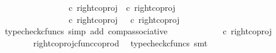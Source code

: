 \begin{isabellebody}
\ \ \isamarkupfalse%
{\isacharminus}{\kern0pt}\ \isanewline
\ \ \ \ \isamarkupfalse%
\ {\isachardoublequoteopen}{\isasymlangle}{\isasymf}{\isacharcomma}{\kern0pt}\ {\isasymf}{\isasymrangle}\ {\isasymamalg}\ {\isasymlangle}{\isasymt}{\isacharcomma}{\kern0pt}{\isasymf}{\isasymrangle}\ {\isasymamalg}\ {\isasymlangle}{\isasymf}{\isacharcomma}{\kern0pt}{\isasymt}{\isasymrangle}\ {\isasymcirc}\isactrlsub c\ {\isacharparenleft}{\kern0pt}right{\isacharunderscore}{\kern0pt}coproj\ {\isasymone}\ {\isacharparenleft}{\kern0pt}{\isasymone}{\isasymCoprod}{\isasymone}{\isacharparenright}{\kern0pt}{\isasymcirc}\isactrlsub c\ right{\isacharunderscore}{\kern0pt}coproj\ {\isasymone}\ {\isasymone}{\isacharparenright}{\kern0pt}\ {\isacharequal}{\kern0pt}\ \isanewline
\ \ \ \ \ \ \ \ \ \ {\isacharparenleft}{\kern0pt}{\isasymlangle}{\isasymf}{\isacharcomma}{\kern0pt}\ {\isasymf}{\isasymrangle}\ {\isasymamalg}\ {\isasymlangle}{\isasymt}{\isacharcomma}{\kern0pt}{\isasymf}{\isasymrangle}\ {\isasymamalg}\ {\isasymlangle}{\isasymf}{\isacharcomma}{\kern0pt}{\isasymt}{\isasymrangle}\ {\isasymcirc}\isactrlsub c\ right{\isacharunderscore}{\kern0pt}coproj\ {\isasymone}\ {\isacharparenleft}{\kern0pt}{\isasymone}{\isasymCoprod}{\isasymone}{\isacharparenright}{\kern0pt}\ {\isacharparenright}{\kern0pt}{\isasymcirc}\isactrlsub c\ right{\isacharunderscore}{\kern0pt}coproj\ {\isasymone}\ {\isasymone}{\isachardoublequoteclose}\isanewline
\ \ \ \ \ \ \isamarkupfalse%
\ {\isacharparenleft}{\kern0pt}typecheck{\isacharunderscore}{\kern0pt}cfuncs{\isacharcomma}{\kern0pt}\ simp\ add{\isacharcolon}{\kern0pt}\ comp{\isacharunderscore}{\kern0pt}associative{}{\isacharparenright}{\kern0pt}\isanewline
\ \ \ \ \isamarkupfalse%
\ \isamarkupfalse%
\ {\isachardoublequoteopen}{\isachardot}{\kern0pt}{\isachardot}{\kern0pt}{\isachardot}{\kern0pt}\ {\isacharequal}{\kern0pt}\ {\isasymlangle}{\isasymt}{\isacharcomma}{\kern0pt}{\isasymf}{\isasymrangle}\ {\isasymamalg}\ {\isasymlangle}{\isasymf}{\isacharcomma}{\kern0pt}{\isasymt}{\isasymrangle}\ {\isasymcirc}\isactrlsub c\ right{\isacharunderscore}{\kern0pt}coproj\ {\isasymone}\ {\isasymone}{\isachardoublequoteclose}\isanewline
\ \ \ \ \ \ \isamarkupfalse%
\ right{\isacharunderscore}{\kern0pt}coproj{\isacharunderscore}{\kern0pt}cfunc{\isacharunderscore}{\kern0pt}coprod\ \isamarkupfalse%
\ {\isacharparenleft}{\kern0pt}typecheck{\isacharunderscore}{\kern0pt}cfuncs{\isacharcomma}{\kern0pt}\ smt{\isacharparenright}{\kern0pt}\isanewline
\ \ \ \ \isamarkupfalse%

\end{isabellebody}
